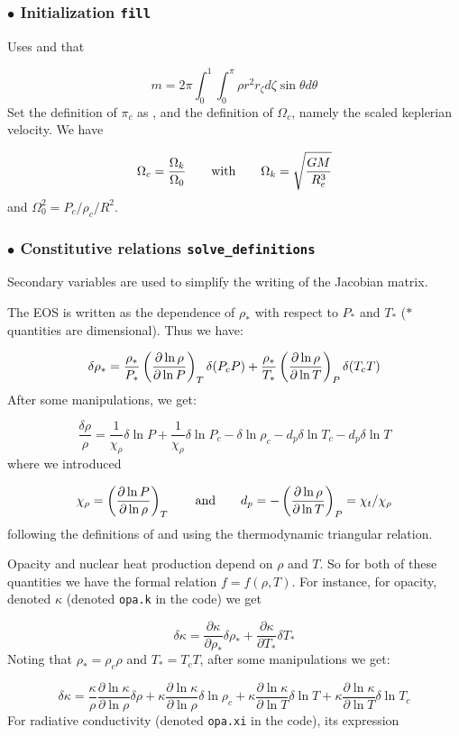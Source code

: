 \subsubsection{$\bullet$ \bf Initialization {\tt fill}}

Uses  and that

\[ m=2\pi\int_0^1\int_0^\pi\rho r^2r_\zeta d\zeta\sin\theta d\theta\]
Set the definition of $\pi_c$ as , and the definition of 
$\Omega_c$, namely the scaled keplerian velocity. We have

\[ \Omega_c=\frac{\Omega_k}{\Omega_0} {\qquad {\rm with}\qquad} \Omega_k=\sqrt{\frac{GM}{R_e^3}}\]
and $\Omega_0^2=P_c/\rho_c/R^2$.

\subsubsection{$\bullet$ \bf Constitutive relations {\tt solve\_definitions}}

Secondary variables are used to simplify the writing of the Jacobian
matrix.

The EOS is written as the dependence of $\rho_*$ with respect to $P_*$ and
$T_*$ ($*$ quantities are dimensional). Thus we have:

\[ \delta\rho_* = \frac{\rho_*}{P_*}\left(\frac{\partial\ln\rho}{\partial\ln
P}\right)_T\delta(P_cP) + \frac{\rho_*}{T_*}\left(\frac{\partial\ln\rho}{\partial\ln
T}\right)_P\delta(T_cT)\]
After some manipulations, we get:

\[ \frac{\delta\rho}{\rho} = \frac{1}{\chi_\rho}\delta\ln P +
\frac{1}{\chi_\rho}\delta\ln P_c -\delta\ln\rho_c - d_p\delta\ln T_c -
d_p\delta\ln T\]
where we introduced

\[ \chi_\rho = \left(\frac{\partial\ln P}{\partial\ln\rho}\right)_T \qquad {\rm and}\qquad d_p
= -\left(\frac{\partial\ln\rho}{\partial\ln T}\right)_P = \chi_t/\chi_\rho \]
following the definitions of \cite{RSI96} and using the thermodynamic
triangular relation.

\bigskip
Opacity and nuclear heat production depend on $\rho$ and $T$. So for both of
these quantities we have the formal relation $f=f(\rho,T)$. For instance, for
opacity, denoted $\kappa$ (denoted {\tt opa.k} in the code) we get

\[ \delta\kappa = \frac{\partial\kappa}{\partial\rho_*}\delta\rho_* +
\frac{\partial\kappa}{\partial T_*}\delta T_*\]
Noting that $\rho_*=\rho_c\rho$ and $T_*=T_cT$, after some manipulations we
get:

\[ \delta\kappa =
\frac{\kappa}{\rho}\frac{\partial\ln\kappa}{\partial\ln\rho}\delta\rho +
\kappa\frac{\partial\ln\kappa}{\partial\ln\rho}\delta\ln\rho_c +
\kappa\frac{\partial\ln\kappa}{\partial\ln T}\delta\ln T +
\kappa\frac{\partial\ln\kappa}{\partial\ln T}\delta\ln T_c\]
For radiative conductivity (denoted {\tt opa.xi} in the code), its expression

